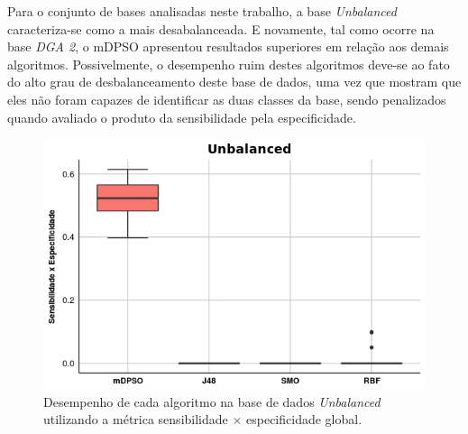 \documentclass[
	12pt,				%
	openany,			%
	oneside,	
	a4paper,			%
	brazil,				%
	]{unimontes-ppgmsc-abntex2}
\begin{document}
\begin{table}[!ht]
\setlength{\arrayrulewidth}{.2em}
\vspace{12pt}
\centering{}
\caption{Desempenho de cada algoritmo usando o produto da sensibilidade pela especificidade em cada classe na base {\em Ionosphere} global.}
\label{tab:sen_esp_classe_ionosphere}
\end{table}

Para o conjunto de bases analisadas neste trabalho, a base {\em Unbalanced} caracteriza-se como a mais desabalanceada. E novamente, tal como ocorre na base {\em DGA 2}, o mDPSO apresentou resultados superiores em relação aos demais algoritmos. Possivelmente, o desempenho ruim destes algoritmos deve-se ao fato do alto grau de desbalanceamento deste base de dados, uma vez que mostram que eles não foram capazes de identificar as duas classes da base, sendo penalizados quando avaliado o produto da sensibilidade pela especificidade.

\begin{figure}[!ht]
\centering
\includegraphics[scale=.7]{graficos/unbalanced}
\caption{Desempenho de cada algoritmo na base de dados {\em Unbalanced} utilizando a métrica sensibilidade $\times$ especificidade global.}
\label{fig:unbalanced}
\end{figure}
\end{document}
